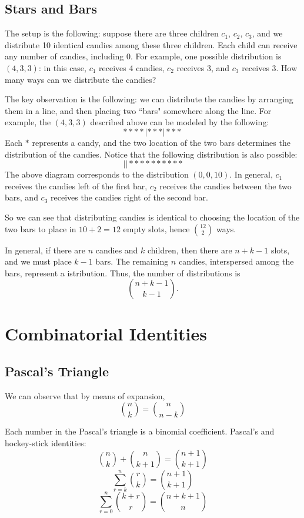 \subsection{Stars and Bars}
The setup is the following: suppose there are three children $c_1$, $c_2$, $c_3$, and we distribute 10 identical candies among these three children. Each child can receive any number of candies, including 0. For example, one possible distribution is $(4,3,3)$: in this case, $c_1$ receives 4 candies, $c_2$ receives 3, and $c_3$ receives 3. How many ways can we distribute the candies?

The key observation is the following: we can distribute the candies by arranging them in a line, and then placing two ``bars" somewhere along the line. For example, the $(4,3,3)$ described above can be modeled by the following:
\[ \ast\ast\ast\ast | \ast\ast\ast | \ast\ast\ast \]
Each $\ast$ represents a candy, and the two location of the two bars determines the distribution of the candies. Notice that the following distribution is also possible:
\[ ||\ast\ast\ast\ast\ast\ast\ast\ast\ast\ast \]
The above diagram corresponds to the distribution $(0,0,10)$. In general, $c_1$ receives the candies left of the first bar, $c_2$ receives the candies between the two bars, and $c_3$ receives the candies right of the second bar.

So we can see that distributing candies is identical to choosing the location of the two bars to place in $10+2=12$ empty slots, hence $\binom{12}{2}$ ways.

In general, if there are $n$ candies and $k$ children, then there are $n+k-1$ slots, and we must place $k-1$ bars. The remaining $n$ candies, interspersed among the bars, represent a istribution.
Thus, the number of distributions is
\[\binom{n+k-1}{k-1}.\]
\pagebreak

\section{Combinatorial Identities}
\subsection{Pascal's Triangle}
We can observe that by means of expansion,
\begin{equation} \binom{n}{k} = \binom{n}{n-k} \end{equation}

Each number in the Pascal's triangle is a binomial coefficient. Pascal's and hockey-stick identities:
\begin{equation} 
\binom{n}{k} + \binom{n}{k+1} = \binom{n+1}{k+1} 
\end{equation}
\begin{equation}
\sum_{r=k}^{n} \binom{r}{k} = \binom{n+1}{k+1}
\end{equation}
\begin{equation}
\sum_{r=0}^{n} \binom{k+r}{r} = \binom{n+k+1}{n}
\end{equation}

